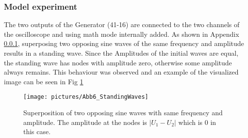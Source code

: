 \documentclass[a4paper,10pt,twocolumn]{article}
\begin{document}
    \subsubsection{Model experiment}
    The two outputs of the Generator (41-16) are connected to the two channels of the oscilloscope and using math mode internally added.
    As shown in Appendix \ref{}, superposing two opposing sine waves of the same frequency and amplitude results in a standing wave.
    Since the Amplitudes of the initial waves are equal, the standing wave has nodes with amplitude zero, otherwise some amplitude always remains.
    This behaviour was observed and an example of the visualized image can be seen in Fig \ref{fig:standingWaves}
    \begin{figure}
        \begin{center}
            \texttt{[image: pictures/Abb6\_StandingWaves]}
            \caption[]{Superposition of two opposing sine waves with same frequency and amplitude. The amplitude at the nodes is $|U_1 - U_2|$ which is 0 in this case.}   %
            \label{fig:standingWaves}
        \end{center}
    \end{figure}
\end{document}
